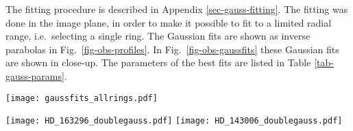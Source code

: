 \documentclass{aa}
\begin{document}
The fitting procedure is described in Appendix \ref{sec-gauss-fitting}.  The
fitting was done in the image plane, in order to make it possible to fit to a
limited radial range, i.e.\ selecting a single ring. The Gaussian fits are shown
as inverse parabolas in Fig.\ \ref{fig-obs-profiles}. In
Fig.~\ref{fig-obs-gaussfits} these Gaussian fits are shown in close-up. The
parameters of the best fits are listed in Table \ref{tab-gauss-params}.

\begin{figure*}
\centerline{\texttt{[image: gaussfits\_allrings.pdf]}}
\caption{\label{fig-obs-gaussfits}Gaussian fits to the eight rings of this
  paper. The blue curves are the observations, the green curves are the best fit
  Gaussian profiles. The ``fit range'' bar shows the radial range within which
  the Gauss was fitted to the data. The fit range was chosen to fit the part of
  the curve that, by eye, most resembles a Gaussian. The ``beam'' bar shows the
  FWHM beam size of the observations. The grey band around the blue curve shows
  the estimated uncertainty of the data.}
\end{figure*}

\begin{figure*}
  \centerline{
    \texttt{[image: HD\_163296\_doublegauss.pdf]}
    \texttt{[image: HD\_143006\_doublegauss.pdf]}
  }
  \caption{\label{fig-obs-doublegauss}The sum of the two Gaussian fits
    for the two sources with two partly overlapping rings: HD 163296 and
    HD 143006.}
\end{figure*}
\end{document}
